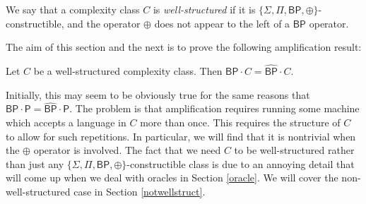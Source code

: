 \documentclass[11pt]{article}
\newcommand{\bp}{\textsf{BP}}
\newcommand{\strongbp}{\widehat{\textsf{BP}}}
\newcommand{\parity}{\oplus}
\newcommand{\p}{\textsf{P}}
\begin{document}
\begin{definition}
We say that a complexity class $C$ is \emph{well-structured} if it is $\{\Sigma, \Pi, \bp, \parity\}$-constructible, and the operator $\parity$ does not appear to the left of a $\bp$ operator.
\end{definition}

The aim of this section and the next is to prove the following amplification result:

\begin{theorem}\label{amplify}
Let $C$ be a well-structured complexity class. Then \emph{$\bp \cdot C = \strongbp \cdot C$}.
\end{theorem}

Initially, this may seem to be obviously true for the same reasons that $\bp \cdot \p = \strongbp \cdot \p$. The problem is that amplification requires running some machine which accepts a language in $C$ more than once. This requires the structure of $C$ to allow for such repetitions. In particular, we will find that it is nontrivial when the $\parity$ operator is involved. The fact that we need $C$ to be well-structured rather than just any $\{\Sigma, \Pi, \bp, \parity\}$-constructible class is due to an annoying detail that will come up when we deal with oracles in Section \ref{oracle}. We will cover the non-well-structured case in Section \ref{notwellstruct}.
\end{document}
